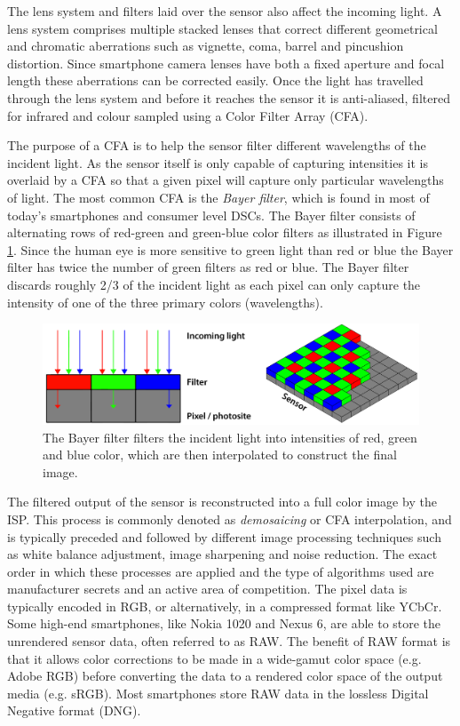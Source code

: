 \documentclass[thesis.tex]{subfiles}
\begin{document}
The lens system and filters laid over the sensor also affect the incoming light. A lens system comprises multiple stacked lenses that correct different geometrical and chromatic aberrations such as vignette, coma, barrel and pincushion distortion. Since smartphone camera lenses have both a fixed aperture and focal length these aberrations can be corrected easily. Once the light has travelled through the lens system and before it reaches the sensor it is anti-aliased, filtered for infrared and colour sampled using a Color Filter Array (CFA). \cite{color_pipeline}

The purpose of a CFA is to help the sensor filter different wavelengths of the incident light. As the sensor itself is only capable of capturing intensities it is overlaid by a CFA so that a given pixel will capture only particular wavelengths of light. The most common CFA is the \textit{Bayer filter}, which is found in most of today's smartphones and consumer level DSCs. The Bayer filter consists of alternating rows of red-green and green-blue color filters as illustrated in Figure \ref{figure:bayer}. Since the human eye is more sensitive to green light than red or blue the Bayer filter has twice the number of green filters as red or blue. The Bayer filter discards roughly 2/3 of the incident light as each pixel can only capture the intensity of one of the three primary colors (wavelengths).

\begin{figure}[h]
\centering \includegraphics[width=\textwidth]{images/bayer}
\caption{The Bayer filter filters the incident light into intensities of red, green and blue color, which are then interpolated to construct the final image. \label{figure:bayer}}
\end{figure}

The filtered output of the sensor is reconstructed into a full color image by the ISP. This process is commonly denoted as \textit{demosaicing} or CFA interpolation, and is typically preceded and followed by different image processing techniques such as white balance adjustment, image sharpening and noise reduction. The exact order in which these processes are applied and the type of algorithms used are manufacturer secrets and an active area of competition. The pixel data is typically encoded in RGB, or alternatively, in a compressed format like YCbCr. Some high-end smartphones, like Nokia 1020 and Nexus 6, are able to store the unrendered sensor data, often referred to as RAW. The benefit of RAW format is that it allows color corrections to be made in a wide-gamut color space (e.g. Adobe RGB) before converting the data to a rendered color space of the output media (e.g. sRGB). Most smartphones store RAW data in the lossless Digital Negative format (DNG).
\end{document}
